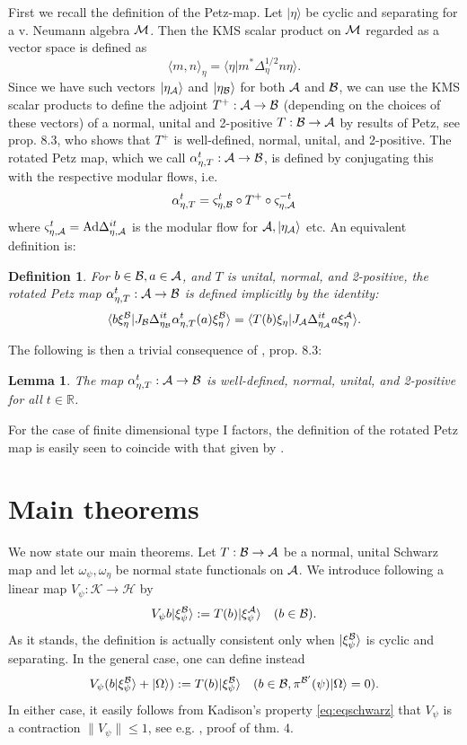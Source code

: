 \documentclass[english,a4paper,12pt]{article}
\newtheorem{lemma}{Lemma}
\newtheorem{definition}{Definition}
\def\sH{\mathscr{H}}
\def\sK{\mathscr{K}}
\def\cA{{\mathfrak A}}
\def\cB{{\mathfrak B}}
\def\cM{{\mathfrak M}}
\newcommand{\ca}[1]{{\cal #1}}
\newcommand{\ben}{\begin{equation}}
\newcommand{\een}{\end{equation}}
\def\cA{{\ca A}}
\def\cB{{\ca B}}
\def\cM{{\ca M}}
\newcommand{\RR}{\mathbb{R}}
\begin{document}
First we recall the definition of the Petz-map. Let $|\eta\rangle$ be cyclic and separating for a v. Neumann algebra $\cM$. Then the KMS scalar product 
on $\cM$ regarded as a vector space is defined as 
\ben
\langle m,n \rangle_\eta = \langle \eta | m^* \Delta_\eta^{1/2} n \eta \rangle . 
\een
Since we have such vectors $|\eta_\cA\rangle$ and $|\eta_\cB\rangle$ for both $\cA$ and $\cB$, we can use the KMS scalar products to 
define the adjoint $T^+:\cA \to \cB$ (depending on the choices of these vectors) of a normal, unital and 2-positive 
$T: \cB \to \cA$ by results of Petz, see \cite{Petz1993} prop. 8.3, 
who shows that $T^+$ is well-defined, normal, unital, and 2-positive. The rotated Petz map, which we call $\alpha_{\eta,T}^t: \cA \to \cB$, 
is defined by conjugating this with the respective modular flows, i.e. 
\ben
\alpha_{\eta,T}^t = \varsigma_{\eta,\cB}^t \circ T^+ \circ \varsigma_{\eta,\cA}^{-t}
\een
where $\varsigma_{\eta,\cA}^t = {\rm Ad} \Delta_{\eta, \cA}^{it}$ is the modular flow for $\cA, |\eta_\cA\rangle$ etc. An equivalent definition is:

\begin{definition}
For $b \in \cB, a \in \cA$, and $T$ is unital, normal, and 2-positive, the rotated Petz map $\alpha_{\eta,T}^t: \cA \to \cB$ is defined implicitly by the identity:
\ben
\label{eq:Petzdef}
\langle b \xi_{\eta}^{\cB} | J_\cB \Delta_{\eta_\cB}^{it} \alpha_{\eta,T}^t(a) \xi_{\eta}^{\cB} \rangle = 
\langle T(b) \xi_\eta | J_\cA \Delta_{\eta_\cA}^{it} a \xi_{\eta}^{\cA} \rangle. 
\een
\end{definition}

The following is then a trivial consequence of \cite{Petz1993}, prop. 8.3:

\begin{lemma}
The map $\alpha_{\eta,T}^t: \cA \to \cB$ is well-defined, normal, unital, and 2-positive for all $t \in \RR$.
\end{lemma}

For the case of finite dimensional type I factors, the definition of the rotated Petz map is easily seen to coincide with that given by \cite{Junge}.

\section{Main theorems}\label{sec:3}

We now state our main theorems. 
Let $T: \cB \to \cA$ be a normal, unital Schwarz map and let $\omega_\psi, \omega_\eta$
be normal state functionals on $\cA$.
We introduce following \cite{Petz4,Petz2} a linear map $V_{\psi}: \sK \to \sH$ by
\ben
\label{eq:Vdef}
V_{\psi}b|\xi_{\psi}^{\cB}\rangle := T(b) |\xi_{\psi}^{\cA} \rangle \quad (b \in \cB).
\een
As it stands, the definition is actually consistent only when $|\xi_{\psi}^{\cB}\rangle$ is cyclic and separating. 
In the general case, one can define \cite{Petz4} instead
\ben
\label{eq:Vdef1}
V_{\psi}(b |\xi_{\psi}^{\cB}\rangle + |\Omega\rangle) := T(b) |\xi_{\psi}^{\cB} \rangle \quad (b \in \cB,
\pi^{\cB'}(\psi) |\Omega\rangle =0).
\een
In either case, it easily follows from Kadison's property \eqref{eq:eqschwarz} that $V_{\psi}$ is a contraction $\|V_{\psi}\| \le 1$, see 
e.g. \cite{Petz4}, proof of thm. 4. 
\end{document}
